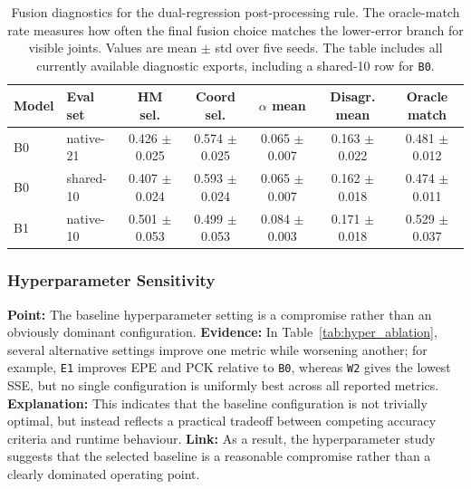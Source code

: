 \documentclass[10pt,letterpaper]{article}
\begin{document}
\begin{table}[t]
\centering
\footnotesize
\caption{Fusion diagnostics for the dual-regression post-processing rule. The oracle-match rate measures how often the final fusion choice matches the lower-error branch for visible joints. Values are mean $\pm$ std over five seeds. The table includes all currently available diagnostic exports, including a shared-10 row for \texttt{B0}.}
\label{tab:fusion_diagnostics}
\begin{tabular}{llccccc}
\toprule
Model & Eval set & HM sel. & Coord sel. & $\alpha$ mean & Disagr. mean & Oracle match \\
\midrule
B0 & native-21 & 0.426 $\pm$ 0.025 & 0.574 $\pm$ 0.025 & 0.065 $\pm$ 0.007 & 0.163 $\pm$ 0.022 & 0.481 $\pm$ 0.012 \\
B0 & shared-10 & 0.407 $\pm$ 0.024 & 0.593 $\pm$ 0.024 & 0.065 $\pm$ 0.007 & 0.162 $\pm$ 0.018 & 0.474 $\pm$ 0.011 \\
B1 & native-10 & 0.501 $\pm$ 0.053 & 0.499 $\pm$ 0.053 & 0.084 $\pm$ 0.003 & 0.171 $\pm$ 0.018 & 0.529 $\pm$ 0.037 \\
\bottomrule
\end{tabular}
\end{table}

\subsubsection{Hyperparameter Sensitivity}

\medskip
\noindent\textbf{Point:} The baseline hyperparameter setting is a compromise rather than an obviously dominant configuration.  
\textbf{Evidence:} In Table~\ref{tab:hyper_ablation}, several alternative settings improve one metric while worsening another; for example, \texttt{E1} improves EPE and PCK relative to \texttt{B0}, whereas \texttt{W2} gives the lowest SSE, but no single configuration is uniformly best across all reported metrics.  
\textbf{Explanation:} This indicates that the baseline configuration is not trivially optimal, but instead reflects a practical tradeoff between competing accuracy criteria and runtime behaviour.  
\textbf{Link:} As a result, the hyperparameter study suggests that the selected baseline is a reasonable compromise rather than a clearly dominated operating point.
\end{document}
